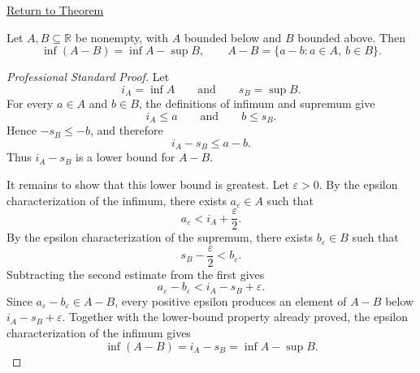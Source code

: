 \newpage
{}
\label{prf:infimum-difference-set}

\begin{remark*}[Return]
\hyperref[thm:infimum-difference-set]{Return to Theorem}
\end{remark*}


\begin{theorem*}
Let $A,B\subseteq\mathbb{R}$ be nonempty, with $A$ bounded below and $B$
bounded above. Then
\[
  \inf(A-B)=\inf A-\sup B,
  \qquad
  A-B=\{a-b:a\in A,\ b\in B\}.
\]
\end{theorem*}

\begin{proof}[Professional Standard Proof]
\LRAProofBodyStart
Let
\[
  i_A=\inf A
  \qquad\text{and}\qquad
  s_B=\sup B.
\]
For every $a\in A$ and $b\in B$, the definitions of infimum and supremum give
\[
  i_A\le a
  \qquad\text{and}\qquad
  b\le s_B.
\]
Hence $-s_B\le -b$, and therefore
\[
  i_A-s_B\le a-b.
\]
Thus $i_A-s_B$ is a lower bound for $A-B$.

It remains to show that this lower bound is greatest. Let $\varepsilon>0$. By
the epsilon characterization of the infimum, there exists $a_\varepsilon\in A$
such that
\[
  a_\varepsilon<i_A+\frac{\varepsilon}{2}.
\]
By the epsilon characterization of the supremum, there exists
$b_\varepsilon\in B$ such that
\[
  s_B-\frac{\varepsilon}{2}<b_\varepsilon.
\]
Subtracting the second estimate from the first gives
\[
  a_\varepsilon-b_\varepsilon
  <
  i_A-s_B+\varepsilon.
\]
Since $a_\varepsilon-b_\varepsilon\in A-B$, every positive epsilon produces an
element of $A-B$ below $i_A-s_B+\varepsilon$. Together with the lower-bound
property already proved, the epsilon characterization of the infimum gives
\[
  \inf(A-B)=i_A-s_B=\inf A-\sup B.
\]
\end{proof}

